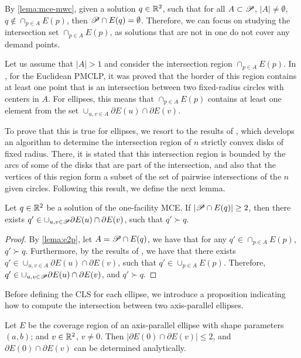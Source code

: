By \autoref{lema:mce-mwc}, given a solution $q\in\mathbb{R}^2$, such that for all $A \subset \mathscr{P}$, $|A|\neq \emptyset$, $q \not \in \cap_{p\in A} E(p)$, then $\mathscr{P} \cap E(q) = \emptyset$. Therefore, we can focus on studying the intersection set $\cap_{p\in A} E(p)$, as solutions that are not in one do not cover any demand points.

Let us assume that $|A|>1$ and consider the intersection region $\cap_{p\in A} E(p)$. 
In \cite{church:1984}, for the Euclidean PMCLP, it was proved that the border of this region contains at least one point that is an intersection between two fixed-radius circles with centers in $A$. For ellipses, this means that $ \cap_{p\in A} E(p)$ contains at least one element from the set $\cup_{u, v \in A}\partial E(u) \cap \partial E(v)$. 

To prove that this is true for ellipses, we resort to the results of \cite{bi}, which develops an algorithm to determine the intersection region of $n$ strictly convex disks of fixed radius. There, it is stated that this intersection region is bounded by the arcs of some of the disks that are part of the intersection, and also that the vertices of this region form a subset of the set of pairwise intersections of the $n$ given circles.
Following this result, we define the next lemma.

\begin{lem}\label{lema:mce}
	Let $q\in \mathbb{R}^2$ be a solution of the one-facility MCE.
	If $|\mathscr{P} \cap E(q)|\ge 2$, then there exists $q' \in \cup_{u, v \in \mathscr{P}}\partial E(u) \cap \partial E(v)$, such that $q' \succ q$.
\end{lem}
\begin{proof}
	By \autoref{lema:e2p}, let $A=\mathscr{P} \cap E(q)$, we have that for any $q' \in \cap_{p\in A} E(p)$, $q' \succ q$. 
	Furthermore, by the results of \cite{bi}, we have that there exists $q' \in \cup_{u, v \in A}\partial E(u) \cap \partial E(v)$, such that $q' \in \cup_{p\in A} E(p)$. 
	Therefore, $q' \in \cup_{u, v \in \mathscr{P}}\partial E(u) \cap \partial E(v)$, and $q' \succ q$.
\end{proof}

Before defining the CLS for each ellipse, we introduce a proposition indicating how to compute the intersection between two axis-parallel ellipses.

\begin{prp}\label{lema:e2p}
	Let $E$ be the coverage region of an axis-parallel ellipse with shape parameters $(a,b)$; and $v \in \mathbb{R}^2$, $v\neq0$. Then $|\partial E(0) \cap \partial E(v)| \le 2$, and $\partial E(0) \cap \partial E(v)$ can be determined analytically.
\end{prp}

